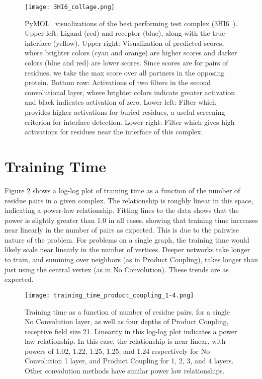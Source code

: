 \begin{figure}
	\texttt{[image: 3HI6\_collage.png]}
	\caption{PyMOL~\cite{schrodinger2015} visualizations of the best performing test complex (3HI6~\cite{zhang2009}). Upper left: Ligand (red) and receptor (blue), along with the true interface (yellow). Upper right: Visualization of predicted scores, where brighter colors (cyan and orange) are higher scores and darker colors (blue and red) are lower scores. Since scores are for pairs of residues, we take the max score over all partners in the opposing protein. Bottom row: Activations of two filters in the second convolutional layer, where brighter colors indicate greater activation and black indicates activation of zero. Lower left: Filter which provides higher activations for buried residues, a useful screening criterion for interface detection. Lower right: Filter which gives high activations for residues near the interface of this complex.
		\label{fig:filter_vis}}
\end{figure}


\section{Training Time}

Figure \ref{fig:train_times} shows a log-log plot of training time as a function of the number of residue pairs in a given complex.
The relationship is roughly linear in this space, indicating a power-law relationship.
Fitting lines to the data shows that the power is slightly greater than 1.0 in all cases, showing that training time increases near linearly in the number of pairs as expected.
This is due to the pairwise nature of the problem.
For problems on a single graph, the training time would likely scale near linearly in the number of vertices.
Deeper networks take longer to train, and summing over neighbors (as in Product Coupling), takes longer than just using the central vertex (as in No Convolution).
These trends are as expected. 


\begin{figure}
	\texttt{[image: training\_time\_product\_coupling\_1-4.png]}
	\caption{Training time as a function of number of residue pairs, for a single No Convolution layer, as well as four depths of Product Coupling, receptive field size 21. Linearity in this log-log plot indicates a power law relationship. In this case, the relationship is near linear, with powers of 1.02, 1.22, 1.25, 1.25, and 1.24 respectively for No Convolution 1 layer, and Product Coupling for 1, 2, 3, and 4 layers. Other convolution methods have similar power law relationships. 
		\label{fig:train_times}}
\end{figure}
